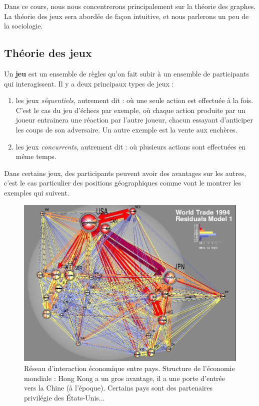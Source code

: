 Dans ce cours, nous nous concentrerons principalement sur la théorie des
graphes. La théorie des jeux sera abordée de façon intuitive, et nous
parlerons un peu de la sociologie.

\subsection{Théorie des jeux}

Un \textbf{jeu} est un ensemble de règles qu'on fait subir à un ensemble
de participants qui interagissent. Il y a deux principaux types de jeux :

\begin{enumerate}
    \item les jeux \textit{séquentiels}, autrement dit : où une seule action
        est effectuée à la fois. C'est le cas du jeu d'échecs par
        exemple, où chaque action produite par un joueur entrainera une
        réaction par l'autre joueur, chacun essayant d'anticiper les
        coups de son adversaire. Un autre exemple est la vente aux
        enchères.
    \item les jeux \textit{concurrents}, autrement dit : où plusieurs
        actions sont effectuées en même temps.
\end{enumerate}

Dans certains jeux, des participants peuvent avoir des avantages sur les
autres, c'est le cas particulier des positions géographiques comme vont
le montrer les exemples qui suivent.

\begin{figure}[!ht]
\centering
\includegraphics[width=0.8\linewidth]{images/network_international_trade.png}
\caption{Réseau d'interaction économique entre pays. Structure de
    l'économie mondiale : Hong Kong a un gros avantage, il a une porte
    d'entrée vers la Chine (à l'époque). Certains pays sont des
partenaires privilégie des États-Unis...}
\end{figure}

